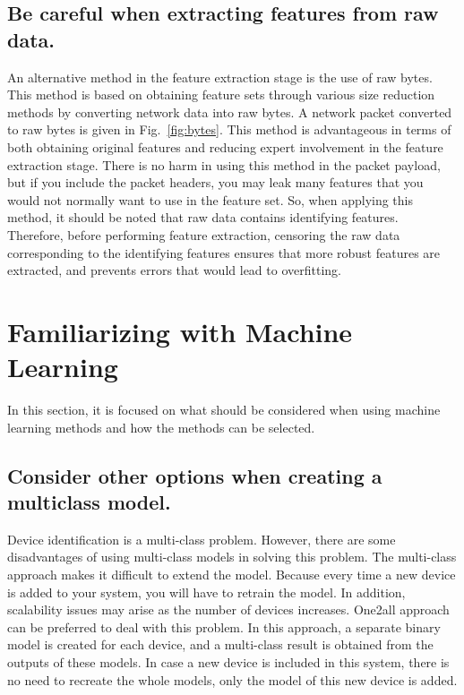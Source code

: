 \documentclass[journal]{IEEEtran}
\begin{document}
\subsection{Be careful when extracting features from raw data.}
An alternative method in the feature extraction stage is the use of raw bytes. This method is based on obtaining feature sets through various size reduction methods by converting network data into raw bytes.  A network packet converted to raw bytes is given in Fig.~\ref{fig:bytes}. This method is advantageous in terms of both obtaining original features and reducing expert involvement in the feature extraction stage. There is no harm in using this method in the packet payload, but if you include the packet headers, you may leak many features that you would not normally want to use in the feature set. So, when applying this method, it should be noted that raw data contains identifying features. Therefore, before performing feature extraction, censoring the raw data corresponding to the identifying features ensures that more robust features are extracted, and prevents errors that would lead to overfitting.



\section{Familiarizing with Machine Learning}\label{section:ML}
In this section, it is focused on what should be considered when using machine learning methods and how the methods can be selected.

\subsection{Consider other options when creating a multiclass model.}
Device identification is a multi-class problem. However, there are some disadvantages of using multi-class models in solving this problem. The multi-class approach makes it difficult to extend the model. Because every time a new device is added to your system, you will have to retrain the model. In addition, scalability issues may arise as the number of devices increases. One2all approach can be preferred to deal with this problem. In this approach, a separate binary model is created for each device, and a multi-class result is obtained from the outputs of these models. In case a new device is included in this system, there is no need to recreate the whole models, only the model of this new device is added.
\end{document}
